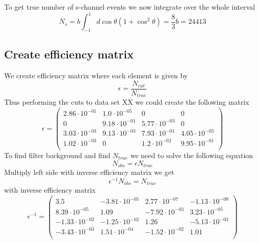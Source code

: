 \documentclass[]{article}
\begin{document}
To get true number of s-channel events we now integrate over the whole interval 
\begin{equation}
N_s = b\int_{-1}^1 d\cos\theta (1+\cos^2\theta) = \frac{8}{3}b = 24413
\end{equation}

\subsection{Create efficiency matrix}
We create efficiency matrix where each element is given by 
\begin{equation}
\epsilon = \frac{N_{cut}}{N_{true}}
\end{equation}
Thus performing the cuts to data set XX we could create the following matrix
\begin{equation}
\epsilon=\begin{pmatrix}
   2.86\cdot 10^{-01} & 1.0\cdot 10^{-05} & 0 & 0 \\
   0 & 9.18\cdot 10^{-01} & 5.77\cdot 10^{-03} & 0 \\
   3.03\cdot 10^{-03} & 9.13\cdot 10^{-03} & 7.93\cdot 10^{-01} & 4.05\cdot 10^{-03} \\
   1.02\cdot 10^{-03} & 0 & 1.2\cdot 10^{-02} & 9.95\cdot 10^{-01} \\
\end{pmatrix}
\end{equation}
To find filter background and find $N_{true}$ we need to solve the following equation
\begin{equation}
N_{obs} = \epsilon N_{true}
\end{equation}
Multiply left side with inverse efficiency matrix we get
\begin{equation}
\epsilon^{-1} N_{obs} = N_{true}
\end{equation}
with inverse efficiency matrix
\begin{equation}
\epsilon^{-1}=\begin{pmatrix}
   3.5 & -3.81\cdot 10^{-05} & 2.77\cdot 10^{-07} & -1.13\cdot 10^{-09} \\
   8.39\cdot 10^{-05} & 1.09 & -7.92\cdot 10^{-03} & 3.23\cdot 10^{-05} \\
   -1.33\cdot 10^{-02} & -1.25\cdot 10^{-02} & 1.26 & -5.13\cdot 10^{-03} \\
   -3.43\cdot 10^{-03} & 1.51\cdot 10^{-04} & -1.52\cdot 10^{-02} & 1.01 \\
\end{pmatrix}
\end{equation}
\end{document}
